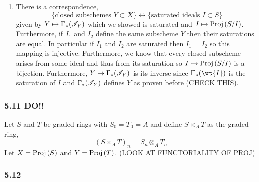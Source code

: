 \documentclass[12pt]{article}
\begin{document}
\begin{enumerate}
\item There is a correspondence,
\[ \{ \text{closed subschemes } Y \subset X \} \leftrightarrow \{ \text{saturated ideals } I \subset S \} \]
given by $Y \mapsto \Gamma_*(\mathscr{I}_Y)$ which we showed is saturated and $I \mapsto \mathrm{Proj}\left( S/I \right)$. Furthermore, if $I_1$ and $I_2$ define the same subscheme $Y$ then their saturations are equal. In particular if $I_1$ and $I_2$ are saturated then $I_1 = I_2$ so this mapping is injective. Furthermore, we know that every closed subscheme arises from some ideal and thus from its saturation so $I \mapsto \mathrm{Proj}\left( S/I \right)$ is a bijection. Furthermore, $Y \mapsto \Gamma_*(\mathscr{I}_Y)$ is its inverse since $\Gamma_*(\wt{I})$ is the saturation of $I$ and $\Gamma_*(\mathscr{I}_Y)$ defines $Y$ as proven before (CHECK THIS).
\end{enumerate}

\subsubsection{5.11 DO!!}

Let $S$ and $T$ be graded rings with $S_0 = T_0 = A$ and define $S \times_A T$ as the graded ring,
\[ (S \times_A T)_n = S_n \otimes_A T_n \]
Let $X = \mathrm{Proj}\left( S \right)$ and $Y = \mathrm{Proj}\left( T \right)$. (LOOK AT FUNCTORIALITY OF PROJ) 

\subsubsection{5.12}
\end{document}
